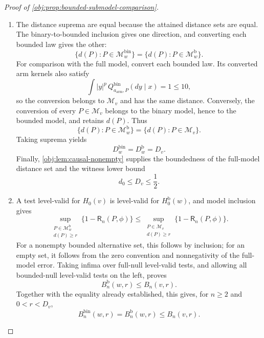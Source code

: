 \begin{proof}[Proof of \cref{obj:prop:bounded-submodel-comparison}]
\begin{enumerate}
\item The distance suprema are equal because the attained distance sets are equal. The binary-to-bounded inclusion gives one direction, and converting each bounded law gives the other:
\[
\{d(P):P\in\mathcal M_w^{\mathrm{bin}}\}
=
\{d(P):P\in\mathcal M_w^{\mathrm b}\}.
\]
For comparison with the full model, convert each bounded law. Its converted arm kernels also satisfy
\[
\int |y|^p\,Q^{\mathrm{bin}}_{a_{\mathrm{arm}},P}(dy\mid x)
=1\le10,
\]
so the conversion belongs to \(\mathcal M_v\) and has the same distance. Conversely, the conversion of every \(P\in\mathcal M_v\) belongs to the binary model, hence to the bounded model, and retains \(d(P)\). Thus
\[
\{d(P):P\in\mathcal M_w^{\mathrm b}\}
=
\{d(P):P\in\mathcal M_v\}.
\]
Taking suprema yields
\[
D_w^{\mathrm{bin}}=D_w^{\mathrm b}=D_v.
\]
Finally, \cref{obj:lem:causal-nonempty} supplies the boundedness of the full-model distance set and the witness lower bound
\[
d_0\le D_v\le\frac12.
\]

\item A test level-valid for \(H_0(v)\) is level-valid for \(H_0^{\mathrm b}(w)\), and model inclusion gives
\[
\sup_{\substack{P\in\mathcal M_w^{\mathrm b}\\d(P)\ge r}}
\{1-\mathsf R_n(P,\phi)\}
\le
\sup_{\substack{P\in\mathcal M_v\\d(P)\ge r}}
\{1-\mathsf R_n(P,\phi)\}.
\]
For a nonempty bounded alternative set, this follows by inclusion; for an empty set, it follows from the zero convention and nonnegativity of the full-model error. Taking infima over full-null level-valid tests, and allowing all bounded-null level-valid tests on the left, proves
\[
B_n^{\mathrm b}(w,r)\le B_n(v,r).
\]
Together with the equality already established, this gives, for \(n\ge2\) and \(0<r<D_v\),
\[
B_n^{\mathrm{bin}}(w,r)=B_n^{\mathrm b}(w,r)\le B_n(v,r).
\]


\end{enumerate}
\end{proof}
